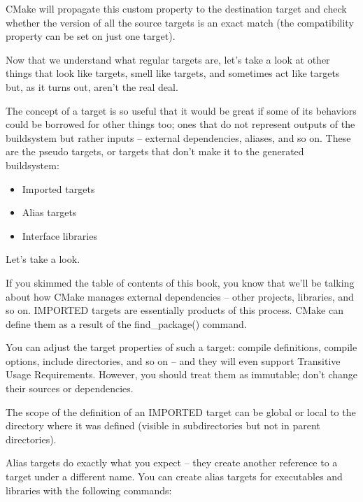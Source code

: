 CMake will propagate this custom property to the destination target and check whether the version of all the source targets is an exact match (the compatibility property can be set on just one target).

Now that we understand what regular targets are, let’s take a look at other things that look like targets, smell like targets, and sometimes act like targets but, as it turns out, aren’t the real deal.


The concept of a target is so useful that it would be great if some of its behaviors could be borrowed for other things too; ones that do not represent outputs of the buildsystem but rather inputs – external dependencies, aliases, and so on. These are the pseudo targets, or targets that don’t make it to the generated buildsystem:

\begin{itemize}
\item
Imported targets

\item
Alias targets

\item
Interface libraries
\end{itemize}

Let’s take a look.


If you skimmed the table of contents of this book, you know that we’ll be talking about how CMake manages external dependencies – other projects, libraries, and so on. IMPORTED targets are essentially products of this process. CMake can define them as a result of the find\_package() command.

You can adjust the target properties of such a target: compile definitions, compile options, include directories, and so on – and they will even support Transitive Usage Requirements. However, you should treat them as immutable; don’t change their sources or dependencies.

The scope of the definition of an IMPORTED target can be global or local to the directory where it was defined (visible in subdirectories but not in parent directories).


Alias targets do exactly what you expect – they create another reference to a target under a different name. You can create alias targets for executables and libraries with the following commands:

